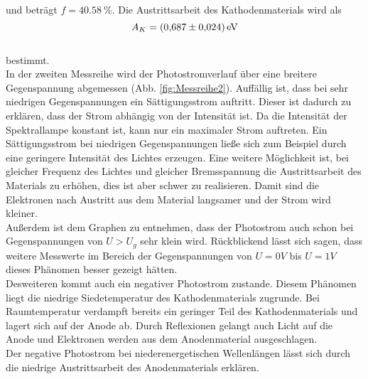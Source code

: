 und beträgt $f=\SI{40.58}{\%}$.
Die Austrittsarbeit des Kathodenmaterials wird als
\begin{equation*}
  A_K=\SI{0.687 \pm 0.024}{eV}
\end{equation*}
\\bestimmt.
\\In der zweiten Messreihe wird der Photostromverlauf über eine breitere Gegenspannung abgemessen (Abb. \ref{fig:Messreihe2}).
Auffällig ist, dass bei sehr niedrigen Gegenspannungen ein Sättigungsstrom auftritt.
Dieser ist dadurch zu erklären, dass der Strom abhängig von der Intensität ist.
Da die Intensität der Spektrallampe konstant ist, kann nur ein maximaler Strom auftreten.
Ein Sättigungsstrom bei niedrigen Gegenspannungen ließe sich zum Beispiel durch eine geringere Intensität des Lichtes erzeugen.
Eine weitere Möglichkeit ist, bei gleicher Frequenz des Lichtes und gleicher Bremsspannung die Austrittsarbeit des Materials zu erhöhen, dies ist aber schwer zu realisieren.
Damit sind die Elektronen nach Austritt aus dem Material langsamer und der Strom wird kleiner.
\\Außerdem ist dem Graphen zu entnehmen, dass der Photostrom auch schon bei Gegenspannungen von $U > U_{g}$ sehr klein wird.
Rückblickend lässt sich sagen, dass weitere Messwerte im Bereich der Gegenspannungen von $U=0V$ bis $U=1V$ dieses Phänomen besser gezeigt hätten.
\\Desweiteren kommt auch ein negativer Photostrom zustande.
Diesem Phänomen liegt die niedrige Siedetemperatur des Kathodenmaterials zugrunde.
Bei Raumtemperatur verdampft bereits ein geringer Teil des Kathodenmaterials und lagert sich auf der Anode ab.
Durch Reflexionen gelangt auch Licht auf die Anode und Elektronen werden aus dem Anodenmaterial ausgeschlagen.
\\Der negative Photostrom bei niederenergetischen Wellenlängen lässt sich durch die niedrige Austrittsarbeit des Anodenmaterials erklären.
